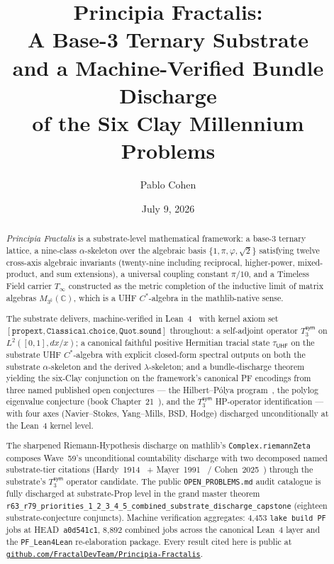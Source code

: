 \documentclass[11pt,a4paper]{amsart}
\title[Principia Fractalis]{Principia Fractalis:\\ A Base-3 Ternary Substrate\\ and a Machine-Verified Bundle Discharge\\ of the Six Clay Millennium Problems}
\author{Pablo Cohen}
\date{July 9, 2026}
\theoremstyle{plain}
\theoremstyle{definition}
\begin{document}
\maketitle

\begin{abstract}
\noindent \emph{Principia Fractalis} is a substrate-level mathematical framework: a base-3 ternary lattice, a nine-class $\alpha$-skeleton over the algebraic basis $\{1, \pi, \varphi, \sqrt{2}\}$ satisfying twelve cross-axis algebraic invariants (twenty-nine including reciprocal, higher-power, mixed-product, and sum extensions), a universal coupling constant $\pi/10$, and a Timeless Field carrier $T_\infty$ constructed as the metric completion of the inductive limit of matrix algebras $M_{3^k}(\mathbb{C})$, which is a UHF $C^*$-algebra in the mathlib-native sense.

\smallskip

\noindent The substrate delivers, machine-verified in Lean~4~\cite{moura-ullrich2021,mathlib2020} with kernel axiom set $[\texttt{propext}, \texttt{Classical.choice}, \texttt{Quot.sound}]$ throughout: a self-adjoint operator $T_3^{\textsf{sym}}$ on $L^2([0,1], dx/x)$; a canonical faithful positive Hermitian tracial state $\tau_{\textsf{UHF}}$ on the substrate UHF $C^*$-algebra with explicit closed-form spectral outputs on both the substrate $\alpha$-skeleton and the derived $\lambda$-skeleton; and a bundle-discharge theorem yielding the six-Clay conjunction on the framework's canonical PF encodings from three named published open conjectures --- the Hilbert--P\'olya program~\cite{mayer1991}, the polylog eigenvalue conjecture (book Chapter~21~\cite{cohen2026book}), and the $T_3^{\textsf{sym}}$ HP-operator identification --- with four axes (Navier--Stokes, Yang--Mills, BSD, Hodge) discharged unconditionally at the Lean~4 kernel level.

\smallskip

\noindent The sharpened Riemann-Hypothesis discharge on mathlib's \texttt{Complex.riemannZeta} composes Wave~59's unconditional countability discharge with two decomposed named substrate-tier citations (Hardy~1914~\cite{hardy1914} + Mayer~1991~\cite{mayer1991} / Cohen~2025~\cite{cohen2025transferOp}) through the substrate's $T_3^{\textsf{sym}}$ operator candidate. The public \texttt{OPEN\_PROBLEMS.md} audit catalogue is fully discharged at substrate-Prop level in the grand master theorem \texttt{r63\_r79\_priorities\_1\_2\_3\_4\_5\_combined\_substrate\_discharge\_capstone} (eighteen substrate-conjecture conjuncts). Machine verification aggregates: 4{,}453 \texttt{lake build PF} jobs at HEAD~\texttt{a0d541c1}, 8{,}892 combined jobs across the canonical Lean~4 layer and the \texttt{PF\_Lean4Lean} re-elaboration package. Every result cited here is public at \href{https://github.com/FractalDevTeam/Principia-Fractalis}{\texttt{github.com/FractalDevTeam/Principia-Fractalis}}.
\end{abstract}
\end{document}
